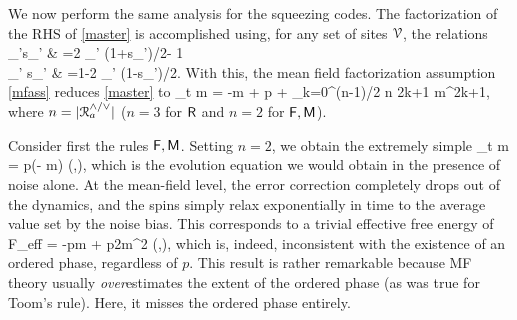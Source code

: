 \documentclass[pra,aps,twocolumn,groupedaddress,superscriptaddress,nofootinbib,preprintnumbers]{revtex4-2}
\begin{document}
	We now perform the same analysis for the squeezing codes. The factorization of the RHS of \eqref{master} is accomplished using, for any set of sites $\mathcal{V}$, the relations 
	\bea \left\lan \bigwedge_{\bfr'\in \mcv}s_{\bfr'} \right\ran & =2 \lan \prod_{\bfr'\in \mcr} (1+s_{\bfr'})/2\ran - 1 \\ 
	\left\lan \bigvee_{\bfr'\in \mcv} s_{\bfr'} \right\ran & =1-2 \lan \prod_{\bfr'\in \mcr} (1-s_{\bfr'})/2\ran.\eea
	With this, the mean field factorization assumption \eqref{mfass} reduces \eqref{master} to 
	\be \p_t m = -m + \eta p +  \sum_{k=0}^{\lfloor (n-1)/2 \rfloor} {n \choose 2k+1} m^{2k+1},\ee 
	where $n = |\mathcal{R}^{\wedge/\vee}_a|$ ($n= 3$ for $\mathsf{R}$ and $n=2$ for $\mathsf{F},\mathsf{M}$). 
	
	Consider first the rules $\mathsf{F},\mathsf{M}$. Setting $n=2$, we obtain the extremely simple 
	\be \label{twosite_mf} \p_t m = p(\eta - m) \qq (\sfF,\sfM),\ee 
	which is the evolution equation we would obtain in the presence of noise alone. At the mean-field level, the error correction completely drops out of the dynamics, and the spins simply relax exponentially in time to the average value set by the noise bias. This corresponds to a trivial effective free energy of 
	\be F_{\rm eff} = -p\eta m + \frac p2m^2 \qq(\sfF,\sfM),\ee 
	which is, indeed, inconsistent with the existence of an ordered phase, regardless of $p$. This result is rather remarkable because MF theory usually {\it over}estimates the extent of the ordered phase (as was true for Toom's rule). Here, it misses the ordered phase entirely. 
	
\end{document}
